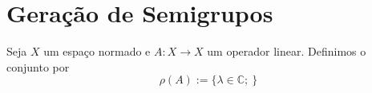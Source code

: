 \section{Geração de Semigrupos}

\begin{definition}
Seja $X$ um espaço normado e $A:X\longrightarrow X$ um operador linear. Definimos o conjunto  por
\begin{equation*}
\rho(A):=\{\lambda \in \mathbb{C};\ \}
\end{equation*}
\end{definition}